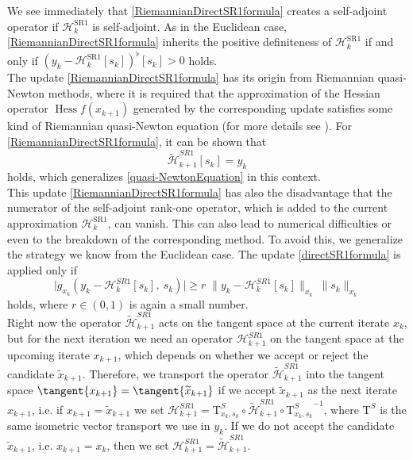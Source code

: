 We see immediately that \cref{RiemannianDirectSR1formula} creates a self-adjoint operator if $\mathcal{H}^\mathrm{SR1}_k$ is self-adjoint. As in the Euclidean case, \cref{RiemannianDirectSR1formula} inherits the positive definiteness of $\mathcal{H}^\mathrm{SR1}_k$ if and only if $(y_k - \mathcal{H}^\mathrm{SR1}_k [s_k])^{\flat} [s_k] > 0$ holds. \\
The update \cref{RiemannianDirectSR1formula} has its origin from Riemannian quasi-Newton methods, where it is required that the approximation of the Hessian operator $\operatorname{Hess} f(x_{k+1})$ generated by the corresponding update satisfies some kind of Riemannian quasi-Newton equation (for more details see \cite[Chapter~2]{Huang:2013}). For \cref{RiemannianDirectSR1formula}, it can be shown that 
\begin{equation*}
    \widetilde{\mathcal{H}}^{SR1}_{k+1} [s_k] = y_k 
\end{equation*}
holds, which generalizes \cref{quasi-NewtonEquation} in this context. \\
This update \cref{RiemannianDirectSR1formula} has also the disadvantage that the numerator of the self-adjoint rank-one operator, which is added to the current approximation $\mathcal{H}^\mathrm{SR1}_k$, can vanish. This can also lead to numerical difficulties or even to the breakdown of the corresponding method. To avoid this, we generalize the strategy we know from the Euclidean case. The update \cref{directSR1formula} is applied only if 
\begin{equation}\label{RiemannianSafeguard}
    \lvert g_{x_k}(y_k - \mathcal{H}^{SR1}_k[s_k], \ s_k) \rvert \geq r \; \lVert y_k - \mathcal{H}^{SR1}_k[s_k] \rVert_{x_k} \ \lVert s_k \rVert_{x_k}
\end{equation}
holds, where $r \in (0, 1)$ is again a small number. \\
Right now the operator $\widetilde{\mathcal{H}}^{SR1}_{k+1}$ acts on the tangent space at the current iterate $x_k$, but for the next iteration we need an operator $\mathcal{H}^{SR1}_{k+1}$ on the tangent space at the upcoming iterate $x_{k+1}$, which depends on whether we accept or reject the candidate $\widetilde{x}_{k+1}$. Therefore, we transport the operator $\widetilde{\mathcal{H}}^{SR1}_{k+1}$ into the tangent space $\tangent{x_{k+1}} = \tangent{\widetilde{x}_{k+1}}$ if we accept $\widetilde{x}_{k+1}$ as the next iterate $x_{k+1}$, i.e. if $x_{k+1} = \widetilde{x}_{k+1}$ we set $\mathcal{H}^{SR1}_{k+1} = \mathrm{T}^{S}_{x_k, s_k} \circ \widetilde{\mathcal{H}}^{SR1}_{k+1} \circ {\mathrm{T}^{S}_{x_k, s_k}}^{-1}$, where $\mathrm{T}^{S}$ is the same isometric vector transport we use in $y_k$. If we do not accept the candidate $\widetilde{x}_{k+1}$, i.e. $x_{k+1} = x_k$, then we set $\mathcal{H}^{SR1}_{k+1} = \widetilde{\mathcal{H}}^{SR1}_{k+1}$. \\
